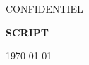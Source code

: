 \thispagestyle{empty}
\begin{center} CONFIDENTIEL \end{center}

\vspace{9cm}

\begin{center} {\Huge \textbf{SCRIPT}} \end{center}

\vspace{9cm}

\begin{center} \today \end{center}
\clearpage

